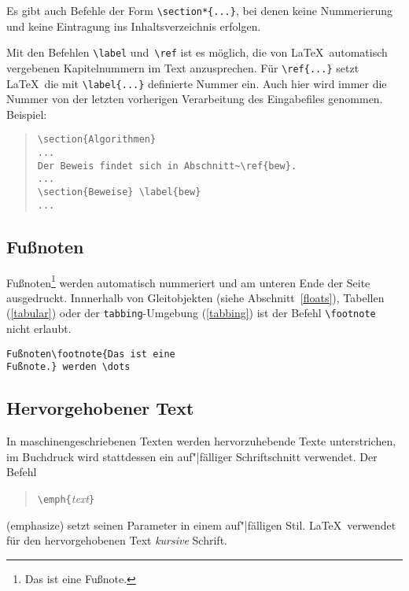 Es gibt auch Befehle der Form \verb|\section*{...}|, bei denen
keine Nummerierung und keine Eintragung ins Inhaltsverzeichnis
erfolgen.

Mit den Befehlen \verb|\label| und~\verb|\ref| ist es möglich,
die von \LaTeX\ automatisch vergebenen Kapitelnummern im Text
anzusprechen.
Für \verb|\ref{...}| setzt \LaTeX\ die
mit \verb|\label{...}| definierte Nummer ein.
Auch hier wird immer die Nummer von der letzten vorherigen
Verarbeitung des Eingabefiles genommen.
Beispiel:
\begin{quote}
\begin{verbatim}
\section{Algorithmen}
...
Der Beweis findet sich in Abschnitt~\ref{bew}.
...
\section{Beweise} \label{bew}
...
\end{verbatim}
\end{quote}
 
 
\subsection{Fußnoten}
 
Fußnoten\footnote{Das 
ist eine Fußnote.} werden automatisch nummeriert
und am unteren Ende der Seite ausgedruckt.  
Innnerhalb von Gleitobjekten (siehe Abschnitt~\ref{floats}), 
Tabellen (\ref{tabular}) oder der \texttt{tabbing}-Umgebung (\ref{tabbing})
ist der Befehl \verb|\footnote| nicht erlaubt.
\exa
~
\exb
\begin{verbatim}
Fußnoten\footnote{Das ist eine
Fußnote.} werden \dots
\end{verbatim}
\exc
 
 
 
\subsection{Hervorgehobener Text}
 
In maschinengeschriebenen Texten werden hervorzuhebende Texte
unterstrichen, im Buchdruck wird stattdessen ein auf"|fälliger
Schriftschnitt verwendet.
Der Befehl 
\begin{quote}
\verb|\emph{|\textit{text}\verb|}| 
\end{quote}
(emphasize) setzt seinen Parameter in einem auf"|fälligen Stil.
\LaTeX\ verwendet für den hervorgehobenen Text \textit{kursive}
Schrift.

